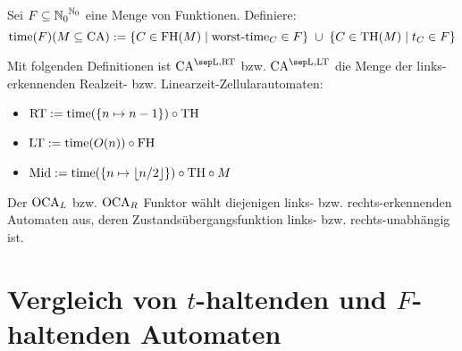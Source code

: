 \begin{definition}

    Sei $F \subseteq {\mathbb{N}_0}^{\mathbb{N}_0}$ eine Menge von Funktionen. Definiere:
    \[
        \mathrm{time}(F)(M \subseteq \textrm{CA}) := \{ { C \in \textrm{FH}(M) } \; | \; { \operatorname{worst-time}_C \in F } \} \; \cup \; \{ { C \in \textrm{TH}(M) } \; | \; { t_C \in F } \}
    \]
    
    Mit folgenden Definitionen ist $\CAM{\CALeft, \CART}$ \acs{bzw.} $\CAM{\CALeft, \CALT}$ die Menge der links-erkennenden Realzeit- \acs{bzw.} Linearzeit-Zellularautomaten:

    \begin{itemize}
        \item $\mathrm{\textrm{RT}} := \mathrm{time}(\{ {n \mapsto n - 1} \}) \circ \textrm{TH}$
        \item $\mathrm{\textrm{LT}} := \mathrm{time}(O(n)) \circ \textrm{FH}$
        \item $\mathrm{Mid} := \mathrm{time}(\{ {n \mapsto \lfloor n/2 \rfloor} \}) \circ \textrm{TH} \circ M $
    \end{itemize}   
\end{definition}


\begin{definition}
    Der $\operatorname{OCA}_L$ \acs{bzw.} $\operatorname{OCA}_R$ Funktor wählt diejenigen links- \acs{bzw.} rechts-erkennenden Automaten aus, deren Zustandsübergangsfunktion links- \acs{bzw.} rechts-unabhängig ist.
\end{definition}

\section{Vergleich von \texorpdfstring{$t$}{t}-haltenden und \texorpdfstring{$F$}{F}-haltenden Automaten}

